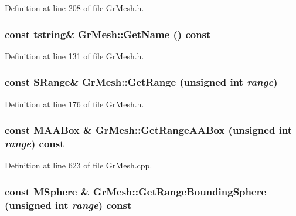 Definition at line 208 of file GrMesh.h.\hypertarget{class_gr_mesh_0e0a8a4a9bf673b8164599bb6b76c0a5}{
\subsubsection[{GetName}]{\setlength{\rightskip}{0pt plus 5cm}const {\bf tstring}\& GrMesh::GetName () const}}
\label{class_gr_mesh_0e0a8a4a9bf673b8164599bb6b76c0a5}




Definition at line 131 of file GrMesh.h.\hypertarget{class_gr_mesh_fab649dd273299791c3813c96224ae75}{
\subsubsection[{GetRange}]{\setlength{\rightskip}{0pt plus 5cm}const {\bf SRange}\& GrMesh::GetRange (unsigned int {\em range})}}
\label{class_gr_mesh_fab649dd273299791c3813c96224ae75}




Definition at line 176 of file GrMesh.h.\hypertarget{class_gr_mesh_f6da12bd6191e5489bf3f7080146de14}{
\subsubsection[{GetRangeAABox}]{\setlength{\rightskip}{0pt plus 5cm}const {\bf MAABox} \& GrMesh::GetRangeAABox (unsigned int {\em range}) const}}
\label{class_gr_mesh_f6da12bd6191e5489bf3f7080146de14}




Definition at line 623 of file GrMesh.cpp.\hypertarget{class_gr_mesh_2d67438c5107a3846d7f8eae065dd515}{
\subsubsection[{GetRangeBoundingSphere}]{\setlength{\rightskip}{0pt plus 5cm}const {\bf MSphere} \& GrMesh::GetRangeBoundingSphere (unsigned int {\em range}) const}}
\label{class_gr_mesh_2d67438c5107a3846d7f8eae065dd515}




